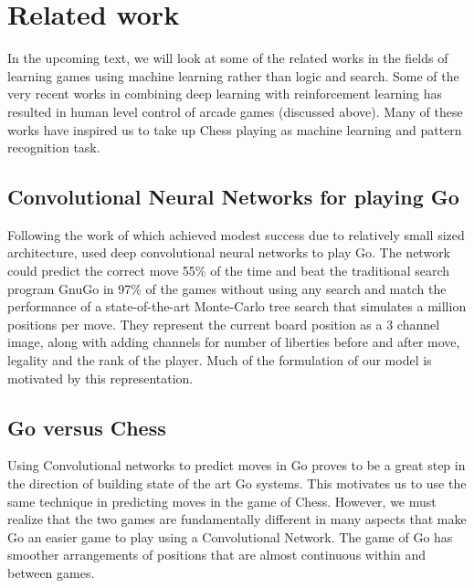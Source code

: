 \section{Related work}
In the upcoming text, we will look at some of the related works in the 
fields of learning games using machine learning rather than logic and search. 
Some of the very recent works in combining deep learning with 
reinforcement learning has resulted in human level control of arcade 
games (discussed above). Many of these works have 
inspired us to take up Chess playing as machine learning and pattern recognition 
task. \\

\label{subsection:previous-works}
\subsection{Convolutional Neural Networks for playing Go}
Following the work of \citet{sutskever2008mimicking} which achieved modest 
success due to relatively small sized architecture, \citet{maddison2014move} 
used deep convolutional neural networks to play Go. The network could predict 
the correct move 55\% of the time and beat the traditional search program 
GnuGo in 97\% of the games without using any search and match the performance 
of a state-of-the-art Monte-Carlo tree search that simulates a million 
positions per move. They represent the current board position as a 3 channel 
image, along with adding channels for number of liberties before and after 
move, legality and the rank of the player. Much of the formulation of our 
model is motivated by this representation.\\

\subsection{Go versus Chess}
Using Convolutional networks to predict moves in Go proves to be a great step 
in the direction of building state of the art Go systems. This motivates us to 
use the same technique in predicting moves in the game of Chess. However, we 
must realize that the two games are fundamentally different in many aspects 
that make Go an easier game to play using a Convolutional Network. The game of 
Go has smoother arrangements of positions that are almost continuous 
within and between games.\\

